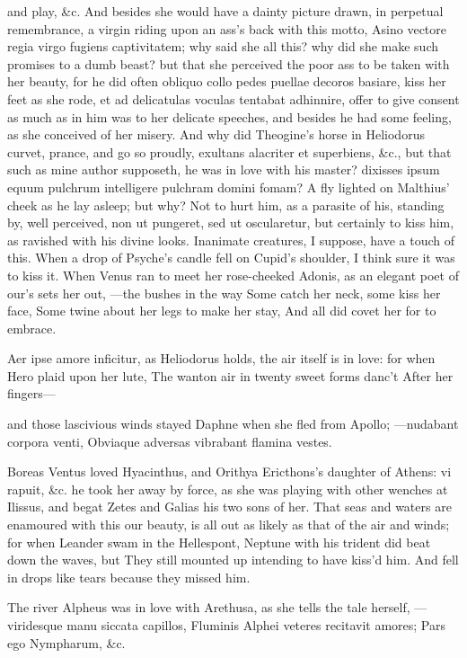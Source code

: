 {and play, \&c. And besides she would have a dainty picture drawn, in
perpetual remembrance, a virgin riding upon an ass's back with this
motto, Asino vectore regia virgo fugiens captivitatem; why said she all
this? why did she make such promises to a dumb beast? but that she
perceived the poor ass to be taken with her beauty, for he did often
obliquo collo pedes puellae decoros basiare, kiss her feet as she rode,
et ad delicatulas voculas tentabat adhinnire, offer to give consent as
much as in him was to her delicate speeches, and besides he had some
feeling, as she conceived of her misery. And why did Theogine's horse
in Heliodorus curvet, prance, and go so proudly, exultans
alacriter et superbiens, \&c., but that such as mine author supposeth,
he was in love with his master? dixisses ipsum equum pulchrum
intelligere pulchram domini fomam? A fly lighted on  Malthius'
cheek as he lay asleep; but why? Not to hurt him, as a parasite of his,
standing by, well perceived, non ut pungeret, sed ut oscularetur, but
certainly to kiss him, as ravished with his divine looks. Inanimate
creatures, I suppose, have a touch of this. When a drop of
Psyche's candle fell on Cupid's shoulder, I think sure it was to
kiss it. When Venus ran to meet her rose-cheeked Adonis, as an elegant
poet of our's sets her out,
---the bushes in the way
Some catch her neck, some kiss her face,
Some twine about her legs to make her stay,
And all did covet her for to embrace.

Aer ipse amore inficitur, as Heliodorus holds, the air itself is in
love: for when Hero plaid upon her lute,
The wanton air in twenty sweet forms danc't
After her fingers---

and those lascivious winds stayed Daphne when she fled from Apollo;
---nudabant corpora venti,
Obviaque adversas vibrabant flamina vestes.

Boreas Ventus loved Hyacinthus, and Orithya Ericthons's daughter of
Athens: vi rapuit, \&c. he took her away by force, as she was playing
with other wenches at Ilissus, and begat Zetes and Galias his two sons
of her. That seas and waters are enamoured with this our beauty, is all
out as likely as that of the air and winds; for when Leander swam in
the Hellespont, Neptune with his trident did beat down the waves, but
They still mounted up intending to have kiss'd him.
And fell in drops like tears because they missed him.

The river Alpheus was in love with Arethusa, as she tells the
tale herself,
---viridesque manu siccata capillos,
Fluminis Alphei veteres recitavit amores;
Pars ego Nympharum, \&c.

}
